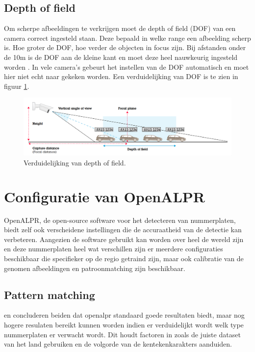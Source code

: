 \subsection{Depth of field}
Om scherpe afbeeldingen te verkrijgen moet de depth of field (DOF) van een camera correct ingesteld staan. Deze bepaald in welke range een afbeelding scherp is. Hoe groter de DOF, hoe verder de objecten in focus zijn. Bij afstanden onder de 10m is de DOF aan de kleine kant en moet deze heel nauwkeurig ingesteld worden \autocite{axis2019license}. In vele camera's gebeurt het instellen van de DOF automatisch en moet hier niet echt naar gekeken worden. Een verduidelijking van DOF is te zien in figuur \ref{fig:dof}.

\begin{figure}[h!]
	\centering
	\includegraphics[width=\linewidth]{img/depth-of-field.png}
	\caption{Verduidelijking van depth of field. \autocite{axis2019license}}
	\label{fig:dof}
\end{figure}


\section{Configuratie van OpenALPR}

OpenALPR, de open-source software voor het detecteren van nummerplaten, biedt zelf ook verscheidene instellingen die de accuraatheid van de detectie kan verbeteren. Aangezien de software gebruikt kan worden over heel de wereld zijn en deze nummerplaten heel wat verschillen zijn er meerdere configuraties beschikbaar die specifieker op de regio getraind zijn, maar ook calibratie van de genomen afbeeldingen en patroonmatching zijn beschikbaar.

\subsection{Pattern matching}
\textcite{arrieta2019prototype} en \textcite{buhus2016automatic} concluderen beiden dat openalpr standaard goede resultaten biedt, maar nog hogere resulaten bereikt kunnen worden indien er verduidelijkt wordt welk type nummerplaten er verwacht wordt. Dit houdt factoren in zoals de juiste dataset van het land gebruiken en de volgorde van de kentekenkarakters aanduiden.

